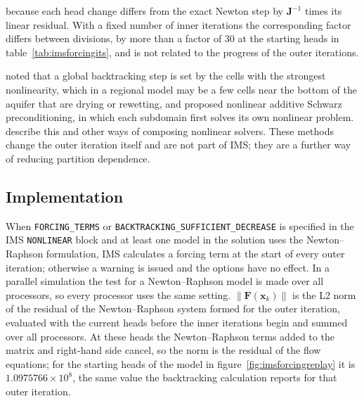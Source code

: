 \noindent because each head change differs from the exact Newton step by $\mathbf{J}^{-1}$ times its linear residual. With a fixed number of inner iterations the corresponding factor differs between divisions, by more than a factor of 30 at the starting heads in table~\ref{tab:imsforcingits}, and is not related to the progress of the outer iterations.

\cite{cai2002nonlinearly} noted that a global backtracking step is set by the cells with the strongest nonlinearity, which in a regional model may be a few cells near the bottom of the aquifer that are drying or rewetting, and proposed nonlinear additive Schwarz preconditioning, in which each subdomain first solves its own nonlinear problem. \cite{brune2015composing} describe this and other ways of composing nonlinear solvers. These methods change the outer iteration itself and are not part of IMS; they are a further way of reducing partition dependence.

\subsection{Implementation}

When \texttt{FORCING\_TERMS} or \texttt{BACKTRACKING\_SUFFICIENT\_DECREASE} is specified in the IMS \texttt{NONLINEAR} block and at least one model in the solution uses the Newton--Raphson formulation, IMS calculates a forcing term at the start of every outer iteration; otherwise a warning is issued and the options have no effect. In a parallel simulation the test for a Newton--Raphson model is made over all processors, so every processor uses the same setting. $\| \mathbf{F}(\mathbf{x}_k) \|$ is the L2 norm of the residual of the Newton--Raphson system formed for the outer iteration, evaluated with the current heads before the inner iterations begin and summed over all processors. At these heads the Newton--Raphson terms added to the matrix and right-hand side cancel, so the norm is the residual of the flow equations; for the starting heads of the model in figure~\ref{fig:imsforcingreplay} it is $1.0975766 \times 10^{8}$, the same value the backtracking calculation reports for that outer iteration.

